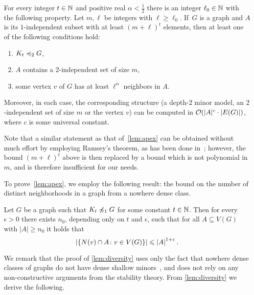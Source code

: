 \begin{lemma}\label{lem:apex}
For every integer $t\in \mathbb{N}$ and positive real $\alpha<\frac 1 2$ 
there is an integer $\ell_0\in\mathbb{N}$ with the following property.
Let $m,\ell$ be integers with $\ell\ge \ell_0$. 
If~$G$ is a graph and $A$ is its $1$-independent subset
with at least $(m+\ell)^{t}$ elements,
then at least one of the following conditions hold:
\begin{enumerate}
  \item $K_t\preccurlyeq_{2} G$,
\item  $A$ contains a $2$-independent set of size $m$, 
\item  some vertex $v$ of $G$
has at least $\ell^{\alpha}$ neighbors in $A$.
\end{enumerate}
Moreover, in each case, the corresponding structure (a depth-$2$ minor model, an $2$-independent set of size $m$ or the vertex $v$) can be computed in $\mathcal{O}(|A|^c\cdot |E(G)|)$, where $c$  is some universal constant.
\end{lemma}

Note that a similar statement as that of~\cref{lem:apex}
can be obtained without much effort by employing Ramsey's theorem, as has been done in~\cite{nevsetvril2011nowhere}; however, the bound $(m+\ell)^t$ above is then replaced by a bound which is not polynomial in $m$, and is therefore insufficient for our needs.

\medskip
To prove~\cref{lem:apex}, we employ the following result: the bound on the number of distinct neighborhoods in a graph from a nowhere dense class.

\begin{lemma}\label{lem:diversity}
Let $G$ be a graph such that $K_t\not\preccurlyeq_{1} G$ for some constant $t\in \mathbb{N}$. 
Then for every $\epsilon>0$ there exists $n_0$, depending only on $t$ and $\epsilon$, such that for all $A\subseteq V(G)$ with $|A|\geq n_0$ it holds that
\[\left\lvert\{N(v)\cap A \colon v\in V(G)\}\right\rvert\leqslant\left\lvert A\right\rvert^{1+\varepsilon}.\]
\end{lemma}



We remark that the proof of \cref{lem:diversity} uses only the fact that
nowhere dense classes of graphs do not have dense 
shallow minors~\cite{dvorak2007asymptotical,jiang2011compact}, and does not rely on any non-constructive arguments from the stability theory.
From \cref{lem:diversity} we derive the following.

